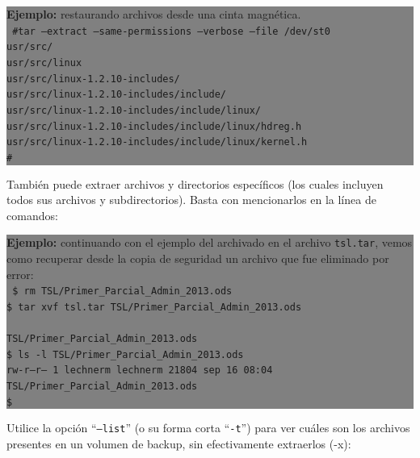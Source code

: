 \documentclass[12pt]{article}
\begin{document}
\colorbox{grey}{\parbox[t]{0.95\linewidth}{ \vspace*{0.5cm} { 
{\bf Ejemplo:} restaurando archivos desde una cinta magnética. \\
{\tt
\#tar --extract --same-permissions --verbose --file /dev/st0\\
usr/src/\\
usr/src/linux\\
usr/src/linux-1.2.10-includes/\\
usr/src/linux-1.2.10-includes/include/\\
usr/src/linux-1.2.10-includes/include/linux/\\
usr/src/linux-1.2.10-includes/include/linux/hdreg.h\\
usr/src/linux-1.2.10-includes/include/linux/kernel.h\\
\#\\
}
} \vspace*{0.5cm} } } 

También puede extraer archivos y directorios específicos (los cuales 
incluyen todos sus archivos y subdirectorios). Basta con mencionarlos en 
la línea de comandos:

\colorbox{grey}{\parbox[t]{0.95\linewidth}{ \vspace*{0.5cm} { 
{\bf Ejemplo:} continuando con el ejemplo del archivado en el archivo 
{\tt tsl.tar}, vemos como recuperar desde la copia de seguridad un archivo
que fue eliminado por error: \\
{\tt
\$ rm TSL/Primer\_Parcial\_Admin\_2013.ods \\
\$ tar xvf tsl.tar TSL/Primer\_Parcial\_Admin\_2013.ods \\
\\TSL/Primer\_Parcial\_Admin\_2013.ods\\
\$ ls -l TSL/Primer\_Parcial\_Admin\_2013.ods\\
\-rw-r--r-- 1 lechnerm lechnerm 21804 sep 16 08:04 TSL/Primer\_Parcial\_Admin\_2013.ods\\
\$ \\
}
} \vspace*{0.5cm} } } 

Utilice la opción ``{\tt --list}'' (o su forma corta ``{\tt -t}'') para 
ver cuáles son los archivos presentes en un volumen de backup, sin efectivamente 
extraerlos (-x):
\end{document}
